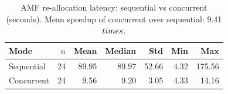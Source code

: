 \begin{table}[htbp]
\centering
\caption{AMF re-allocation latency: sequential vs concurrent (seconds). Mean speedup of concurrent over sequential: 9.41$\\times$.}
\label{tab:comparison}
\begin{tabular}{lrrrrrr}
\hline
Mode & $n$ & Mean & Median & Std & Min & Max \\
\hline
Sequential & 24 & 89.95 & 89.97 & 52.66 & 4.32 & 175.56 \\
Concurrent & 24 & 9.56 & 9.20 & 3.05 & 4.33 & 14.16 \\
\hline
\end{tabular}
\end{table}
